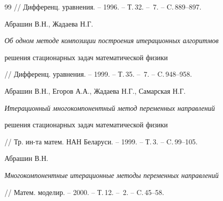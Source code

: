 \begin{thebibliography}{99}
// Дифференц. уравнения. -- 1996. -- Т.\,32. -- \No\,7. -- C.\,889--897.




Абрашин В.Н., Жадаева Н.Г.


{\it Об одном методе композиции построения итерационных алгоритмов


решения стационарных задач математической физики}


// Дифференц. уравнения. -- 1999. -- Т.\,35. -- \No\,7. -- C.\,948--958.




Абрашин В.Н., Егоров А.А., Жадаева Н.Г., Самарская Н.Г.


{\it Итерационный многокомпонентный метод переменных направлений


решения стационарных задач математической физики}


// Тр. ин-та матем. НАН Беларуси. -- 1999. -- Т.\,3. -- C.\,99--105.




Абрашин В.Н.


{\it Многокомпонентные итерационные методы переменных направлений}


// Матем. моделир. -- 2000. -- Т.\,12. -- \No\,2. -- C.\,45--58.





\end{thebibliography}





\vskip 2cm









\smallskip







\label{end}





